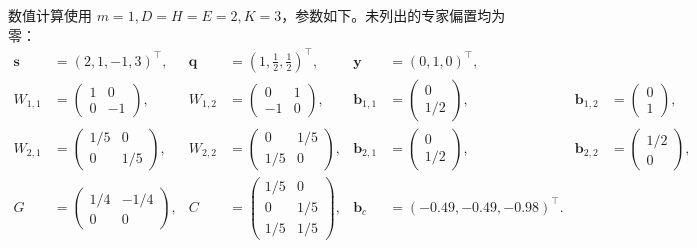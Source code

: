 \documentclass[UTF8,11pt,oneside]{ctexart}
\begin{document}
数值计算使用 $m=1,D=H=E=2,K=3$，参数如下。未列出的专家偏置均为零：
\begin{align*}
\bm{s}&=(2,1,-1,3)^\top,&\bm{q}&=(1,\tfrac12,\tfrac12)^\top,&\bm{y}&=(0,1,0)^\top,\\
W_{1,1}&=\begin{pmatrix}1&0\\0&-1\end{pmatrix},&W_{1,2}&=\begin{pmatrix}0&1\\-1&0\end{pmatrix},&\bm{b}_{1,1}&=\begin{pmatrix}0\\1/2\end{pmatrix},&\bm{b}_{1,2}&=\begin{pmatrix}0\\1\end{pmatrix},\\
W_{2,1}&=\begin{pmatrix}1/5&0\\0&1/5\end{pmatrix},&W_{2,2}&=\begin{pmatrix}0&1/5\\1/5&0\end{pmatrix},&\bm{b}_{2,1}&=\begin{pmatrix}0\\1/2\end{pmatrix},&\bm{b}_{2,2}&=\begin{pmatrix}1/2\\0\end{pmatrix},\\
G&=\begin{pmatrix}1/4&-1/4\\0&0\end{pmatrix},&C&=\begin{pmatrix}1/5&0\\0&1/5\\1/5&1/5\end{pmatrix},&\bm{b}_c&=(-0.49,-0.49,-0.98)^\top.\tag{5}
\end{align*}
\end{document}
